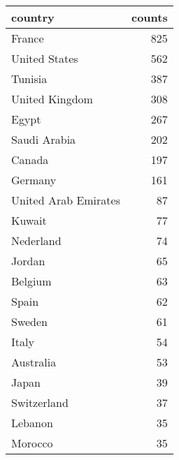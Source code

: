 
\begin{tabular}{lr}
\toprule
country & counts\\
\midrule
France & 825\\
United States & 562\\
Tunisia & 387\\
United Kingdom & 308\\
Egypt & 267\\
\addlinespace
Saudi Arabia & 202\\
Canada & 197\\
Germany & 161\\
United Arab Emirates & 87\\
Kuwait & 77\\
\addlinespace
Nederland & 74\\
Jordan & 65\\
Belgium & 63\\
Spain & 62\\
Sweden & 61\\
\addlinespace
Italy & 54\\
Australia & 53\\
Japan & 39\\
Switzerland & 37\\
Lebanon & 35\\
\addlinespace
Morocco & 35\\
\bottomrule
\end{tabular}
